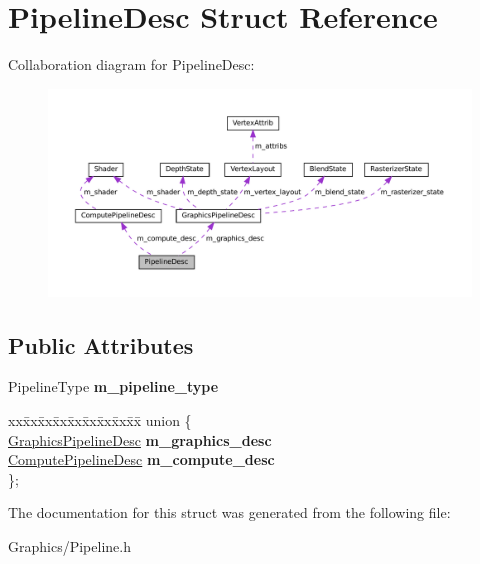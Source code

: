 \hypertarget{structPipelineDesc}{}\section{Pipeline\+Desc Struct Reference}
\label{structPipelineDesc}


Collaboration diagram for Pipeline\+Desc\+:\nopagebreak
\begin{figure}[H]
\begin{center}
\leavevmode
\includegraphics[width=350pt]{structPipelineDesc__coll__graph}
\end{center}
\end{figure}
\subsection*{Public Attributes}
\begin{DoxyCompactItemize}
\item 
\mbox{\label{structPipelineDesc_ace6e002835a89097082cca46f4dedaa9}} 
Pipeline\+Type {\bfseries m\+\_\+pipeline\+\_\+type}
\item 
\mbox{\label{structPipelineDesc_a8a5b7c3d4a9e26c0b05cdad51dadf1c3}} 
\begin{tabbing}
xx\=xx\=xx\=xx\=xx\=xx\=xx\=xx\=xx\=\kill
union \{\\
\>\hyperlink{structGraphicsPipelineDesc}{GraphicsPipelineDesc} {\bfseries m\_graphics\_desc}\\
\>\hyperlink{structComputePipelineDesc}{ComputePipelineDesc} {\bfseries m\_compute\_desc}\\
\}; \\

\end{tabbing}\end{DoxyCompactItemize}


The documentation for this struct was generated from the following file\+:\begin{DoxyCompactItemize}
\item 
Graphics/Pipeline.\+h\end{DoxyCompactItemize}
